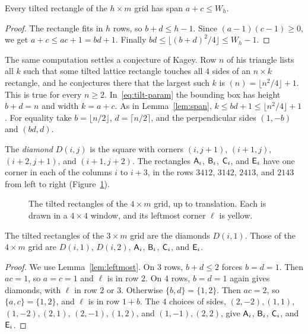 \begin{lemma}\label{lem:span}
Every tilted rectangle of the $h\times m$ grid has span $a+c\le W_h$.
\end{lemma}

\begin{proof}
The rectangle fits in $h$ rows, so $b+d\le h-1$. Since $(a-1)(c-1)\ge0$, we get
$a+c\le ac+1=bd+1$. Finally $bd\le\lfloor(b+d)^2/4\rfloor\le W_h-1$.
\end{proof}

\begin{remark}\label{cor:oeisconj}
The same computation settles a conjecture of Kagey. Row $n$ of his triangle
 lists all $k$ such that some tilted lattice rectangle touches
all $4$ sides of an $n\times k$ rectangle, and he conjectures there that the
largest such $k$ is $(n)=\lfloor n^2/4\rfloor+1$. This is true
for every $n\ge2$. In~\eqref{eq:tilt-param} the bounding box has height $b+d=n$
and width $k=a+c$. As in Lemma~\ref{lem:span}, $k\le bd+1\le\lfloor n^2/4\rfloor+1$.
For equality take $b=\lfloor n/2\rfloor$, $d=\lceil n/2\rceil$, and the
perpendicular sides $(1,-b)$ and $(bd,d)$.
\end{remark}

The \emph{diamond} $D(i,j)$ is the square with corners $(i,j+1)$, $(i+1,j)$,
$(i+2,j+1)$, and $(i+1,j+2)$. The rectangles $\mathsf{A}_i$, $\mathsf{B}_i$, $\mathsf{C}_i$, and
$\mathsf{E}_i$ have one corner in each of the columns $i$ to $i+3$, in the rows
$3412$, $3142$, $2413$, and $2143$ from left to right (Figure~\ref{fig:tilted}).

\begin{figure}[t]
\centering

\caption{The tilted rectangles of the $4\times m$ grid, up to translation. Each is
drawn in a $4\times4$ window, and its leftmost corner $\ell$ is yellow.}
\label{fig:tilted}
\end{figure}

\begin{lemma}\label{lem:tilted-narrow}
The tilted rectangles of the $3\times m$ grid are the diamonds $D(i,1)$. Those of
the $4\times m$ grid are $D(i,1)$, $D(i,2)$, $\mathsf{A}_i$, $\mathsf{B}_i$, $\mathsf{C}_i$, and
$\mathsf{E}_i$.
\end{lemma}

\begin{proof}
We use Lemma~\ref{lem:leftmost}. On $3$ rows, $b+d\le2$ forces $b=d=1$. Then
$ac=1$, so $a=c=1$ and $\ell$ is in row $2$. On $4$ rows, $b=d=1$ again gives
diamonds, with $\ell$ in row $2$ or $3$. Otherwise $\{b,d\}=\{1,2\}$. Then
$ac=2$, so $\{a,c\}=\{1,2\}$, and $\ell$ is in row $1+b$. The $4$ choices of
sides, $(2,-2),(1,1)$, $(1,-2),(2,1)$, $(2,-1),(1,2)$, and $(1,-1),(2,2)$,
give $\mathsf{A}_i$, $\mathsf{B}_i$, $\mathsf{C}_i$, and $\mathsf{E}_i$.
\end{proof}


